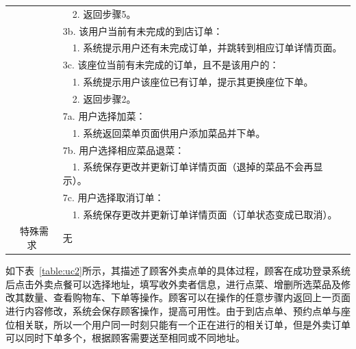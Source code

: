 \begin{table}[htbp!]
\begin{tabular}{cp{11.5cm}}
    & ~~2.	返回步骤5。\\
    & 3b. 该用户当前有未完成的到店订单：\\
    & ~~1.	系统提示用户还有未完成订单，并跳转到相应订单详情页面。\\
    & 3c. 该座位当前有未完成的订单，且不是该用户的：\\
    & ~~1.	系统提示用户该座位已有订单，提示其更换座位下单。\\
    & ~~2.	返回步骤2。\\
    & 7a. 用户选择加菜：\\
    & ~~1.	系统返回菜单页面供用户添加菜品并下单。\\
    & 7b. 用户选择相应菜品退菜：\\
    & ~~1.	系统保存更改并更新订单详情页面（退掉的菜品不会再显示）。\\
    & 7c. 用户选择取消订单：\\
    & ~~1.  系统保存更改并更新订单详情页面（订单状态变成已取消）。\\
  \hline
  \ 特殊需求 & 无 \\ 
  \hline
  \end{tabular}
  \label{table:uc1}
\end{table}

如下表~\ref{table:uc2}所示，其描述了顾客外卖点单的具体过程，顾客在成功登录系统后点击外卖点餐可以选择地址，填写收外卖者信息，进行点菜、增删所选菜品及修改其数量、查看购物车、下单等操作。顾客可以在操作的任意步骤内返回上一页面进行内容修改，系统会保存顾客操作，提高可用性。由于到店点单、预约点单与座位相关联，所以一个用户同一时刻只能有一个正在进行的相关订单，但是外卖订单可以同时下单多个，根据顾客需要送至相同或不同地址。

